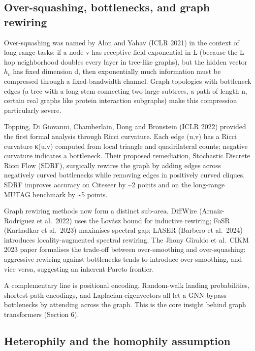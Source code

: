 \documentclass{article}
\begin{document}
\subsection{Over-squashing, bottlenecks, and graph rewiring}\label{over-squashing-bottlenecks-and-graph-rewiring}

Over-squashing was named by Alon and Yahav (ICLR 2021) in the context of long-range tasks: if a node v has receptive field exponential in L (because the L-hop neighborhood doubles every layer in tree-like graphs), but the hidden vector \(h_v\) has fixed dimension d, then exponentially much information must be compressed through a fixed-bandwidth channel. Graph topologies with bottleneck edges (a tree with a long stem connecting two large subtrees, a path of length n, certain real graphs like protein interaction subgraphs) make this compression particularly severe.

Topping, Di Giovanni, Chamberlain, Dong and Bronstein (ICLR 2022) provided the first formal analysis through Ricci curvature. Each edge (u,v) has a Ricci curvature κ(u,v) computed from local triangle and quadrilateral counts; negative curvature indicates a bottleneck. Their proposed remediation, Stochastic Discrete Ricci Flow (SDRF), surgically rewires the graph by adding edges across negatively curved bottlenecks while removing edges in positively curved cliques. SDRF improves accuracy on Citeseer by \textasciitilde2 points and on the long-range MUTAG benchmark by \textasciitilde5 points.

Graph rewiring methods now form a distinct sub-area. DiffWire (Arnaiz-Rodriguez et al.~2022) uses the Lovász bound for inductive rewiring; FoSR (Karhadkar et al.~2023) maximises spectral gap; LASER (Barbero et al.~2024) introduces locality-augmented spectral rewiring. The Jhony Giraldo et al.~CIKM 2023 paper formalises the trade-off between over-smoothing and over-squashing: aggressive rewiring against bottlenecks tends to introduce over-smoothing, and vice versa, suggesting an inherent Pareto frontier.

A complementary line is positional encoding. Random-walk landing probabilities, shortest-path encodings, and Laplacian eigenvectors all let a GNN bypass bottlenecks by attending across the graph. This is the core insight behind graph transformers (Section 6).

\subsection{Heterophily and the homophily assumption}\label{heterophily-and-the-homophily-assumption}
\end{document}
